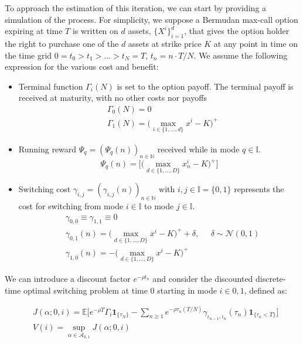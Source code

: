 \documentclass{article}
\begin{document}
To approach the estimation of this iteration, we can start by providing a simulation of the process. For simplicity, we suppose a Bermudan max-call option expiring at time $T$ is written on $d$ assets, $\{X^i\}_{i=1}^d$, that gives the option holder the right to purchase one of the $d$ assets at strike price $K$ at any point in time on the time grid $0=t_0 > t_1> \ldots > t_N = T$, $t_n = n \cdot T/N$. We assume the following expression for the various cost and benefit:
\begin{itemize}
    \item Terminal function $\Gamma_i(N)$ is set to the option payoff. The terminal payoff is received at maturity, with no other costs nor payoffs
    \begin{equation}
    \begin{split}
    &\Gamma_0(N) = 0 \\
    &\Gamma_1(N) = \Big(\max_{i \in \{1, \ldots, d \}} x^i - K   \Big)^{+}
    \end{split}
    \end{equation}
    \item Running reward $\Psi_q = (\Psi_q(n))_{n \in \mathbb{N}}$ received while in mode $q \in \mathbb{I}$. 
    \begin{equation}
    \Psi_q(n) = \Big[\Big(\max_{d \in \{1, \ldots, D\}} x^i_n - K   \Big)^{+} \Big]
    \end{equation}
    \item Switching cost $\gamma_{i, j} = (\gamma_{i, j}(n))_{n \in \mathbb{N}}$ with $i,j \in \mathbb{I} = \{0, 1 \}$ represents the cost for switching from mode $i \in \mathbb{I}$ to mode $j \in \mathbb{I}$.
    \begin{equation}
    \begin{split}
    &\gamma_{0,0} \equiv \gamma_{1,1} \equiv 0 \\
    &\gamma_{0,1}(n) = \Big(\max_{d \in \{1, \ldots, D \}} x^i - K   \Big)^{+} + \delta,  \;\;\;\;\; \delta \sim \mathcal{N}(0,1)  \\ 
    &\gamma_{1, 0}(n) = -\Big(\max_{d \in \{1, \ldots, D \}} x^i - K   \Big)^{+} 
    \end{split}
    \end{equation}
\end{itemize}

We can introduce a discount factor $e^{- \rho t_n}$ and consider the discounted discrete-time optimal switching problem at time 0 starting in mode $i \in {0,1}$, defined as:

\begin{equation}
\begin{split}
    &J(\alpha; 0, i)= \mathbb{E} \Big[e^{- \rho T} \Gamma_{i}\mathbf{1}_{\{\tau_N \}} - \sum_{n \geq 1} e^{- \rho \tau_n (T/N)} \gamma_{\iota_{n-1}, \iota_n}(\tau_n) \mathbf{1}_{\{\tau_n < T \}} \Big]\\
    &V(i) = \sup_{\alpha \in \mathcal{A}_{0,1}} J(\alpha; 0,i)
\end{split}
\end{equation}
\end{document}
